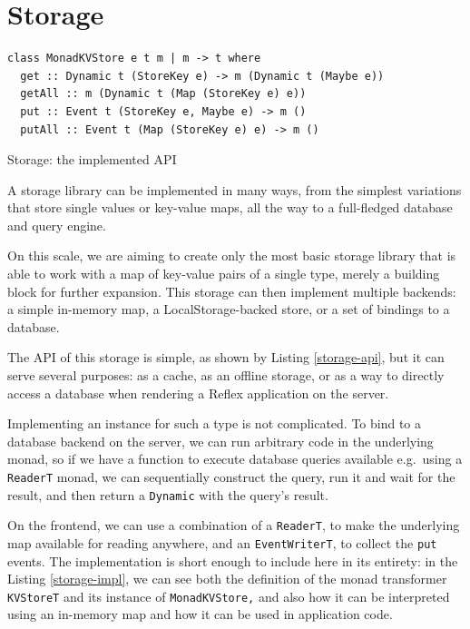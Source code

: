 \documentclass[english,zadani,odsaz]{fitthesis}
\begin{document}
\section{Storage}
\label{sec:org51669db}
\begin{listing}[!b]
\begin{verbatim}
class MonadKVStore e t m | m -> t where
  get :: Dynamic t (StoreKey e) -> m (Dynamic t (Maybe e))
  getAll :: m (Dynamic t (Map (StoreKey e) e))
  put :: Event t (StoreKey e, Maybe e) -> m ()
  putAll :: Event t (Map (StoreKey e) e) -> m ()
\end{verbatim}
\caption{Storage: the implemented API \label{storage-api}}
\end{listing}

A storage library can be implemented in many ways, from the simplest variations
that store single values or key-value maps, all the way to a full-fledged
database and query engine.

On this scale, we are aiming to create only the most basic storage library that
is able to work with a map of key-value pairs of a single type, merely a
building block for further expansion. This storage can then implement multiple
backends: a simple in-memory map, a LocalStorage-backed store, or a set of
bindings to a database.

The API of this storage is simple, as shown by Listing \ref{storage-api}, but it
can serve several purposes: as a cache, as an offline storage, or as a way to
directly access a database when rendering a Reflex application on the server.

Implementing an instance for such a type is not complicated. To bind to a
database backend on the server, we can run arbitrary code in the underlying
monad, so if we have a function to execute database queries available
e.g.~using a \texttt{ReaderT} monad, we can sequentially construct the query, run
it and wait for the result, and then return a \texttt{Dynamic} with the query's result.

On the frontend, we can use a combination of a \texttt{ReaderT}, to make the underlying
map available for reading anywhere, and an \texttt{EventWriterT}, to collect the \texttt{put}
events. The implementation is short enough to include here in its entirety: in
the Listing \ref{storage-impl}, we can see both the definition of the monad
transformer \texttt{KVStoreT} and its instance of \texttt{MonadKVStore,} and also how it can be
interpreted using an in-memory map and how it can be used in application code.
\end{document}
